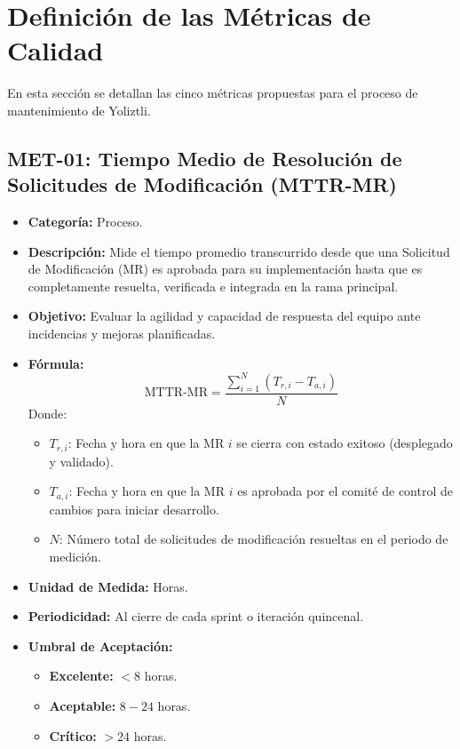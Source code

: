\documentclass[12pt]{article}
\begin{document}
\section{Definición de las Métricas de Calidad}

En esta sección se detallan las cinco métricas propuestas para el proceso de mantenimiento de Yoliztli.

\subsection{MET-01: Tiempo Medio de Resolución de Solicitudes de Modificación (MTTR-MR)}
\label{subsec:met01}

\begin{itemize}
    \item \textbf{Categoría:} Proceso.
    \item \textbf{Descripción:} Mide el tiempo promedio transcurrido desde que una Solicitud de Modificación (MR) es aprobada para su implementación hasta que es completamente resuelta, verificada e integrada en la rama principal.
    \item \textbf{Objetivo:} Evaluar la agilidad y capacidad de respuesta del equipo ante incidencias y mejoras planificadas.
    \item \textbf{Fórmula:}
    \begin{equation}
        \text{MTTR-MR} = \frac{\sum_{i=1}^{N} (T_{r, i} - T_{a, i})}{N}
    \end{equation}
    Donde:
    \begin{itemize}
        \item $T_{r, i}$: Fecha y hora en que la MR $i$ se cierra con estado exitoso (desplegado y validado).
        \item $T_{a, i}$: Fecha y hora en que la MR $i$ es aprobada por el comité de control de cambios para iniciar desarrollo.
        \item $N$: Número total de solicitudes de modificación resueltas en el periodo de medición.
    \end{itemize}
    \item \textbf{Unidad de Medida:} Horas.
    \item \textbf{Periodicidad:} Al cierre de cada sprint o iteración quincenal.
    \item \textbf{Umbral de Aceptación:} 
    \begin{itemize}
        \item \textcolor{process}{\textbf{Excelente:}} $< 8$ horas.
        \item \textcolor{value}{\textbf{Aceptable:}} $8 - 24$ horas.
        \item \textcolor{accentred}{\textbf{Crítico:}} $> 24$ horas.
    \end{itemize}
\end{itemize}
\end{document}
